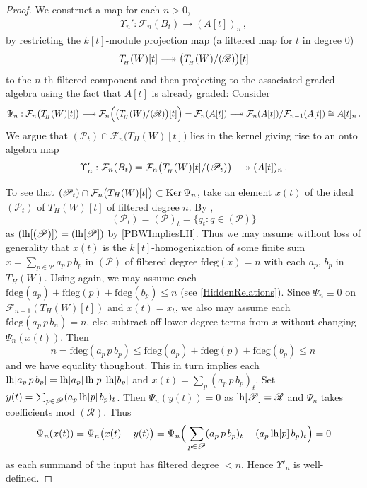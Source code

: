 \documentclass[11pt]{amsart}
\numberwithin{equation}{section}
\newcommand{\BBB}{B}
\newcommand{\sA}{A }
\newcommand{\RR}{\mathscr{R} }
\newcommand{\PP}{\mathscr{P}}
\newcommand{\LH}{{\rm{lh}}}
\renewcommand{\_}[1]{\mbox{$_{\left( #1 \right)}$}}
\newcommand{\F}{\mathcal F}
\renewcommand{\ker}{\mbox{\rm Ker\,}}
\begin{document}
{\begin{proof}
We construct a map for each $n>0$,
$$
\begin{aligned}
  \Upsilon_n': \F_n(\BBB_t)
  \longrightarrow
(\sA[t])_n 
\, ,  
\end{aligned}
$$
by restricting the $k[t]$-module projection map
(a filtered map for $t$ in degree $0$)
$$T_{\! _H}(W)[t]\relbar\joinrel\twoheadrightarrow %
\big(T_{\! _H}(W)/(\RR)\big)[t]
$$
to the $n$-th filtered component
and then projecting to the associated graded algebra
using the fact that $\sA[t]$ is already graded:
Consider
$$
\begin{aligned}
  \Psi_n: 
   \F_n\big(T_{\! _H}(W)[t]\big)
  \relbar\joinrel\twoheadrightarrow %
  \F_n\Big( \big(T_{\! _H}(W)/(\RR)\big)[t]\Big)=\F_n(\sA[t])
  \relbar\joinrel\twoheadrightarrow %
  \F_n(\sA[t])/\F_{n-1}(\sA[t])
  \cong \sA[t]_n
  \,  .
\end{aligned}
$$
We argue that $(\PP_t) \cap \F_n\big(T_{H}(W)[t]\big)$
lies in the kernel
giving rise to an onto
algebra map
$$
\begin{aligned}
\Upsilon'_n: \F_n(\BBB_t) = \F_n\big(T_{\! _H}(W)[t]/(\PP_t)\big)
  \relbar\joinrel\twoheadrightarrow (\sA[t])_n 
\,  .
\end{aligned}
$$

To see that $(\PP_t) \cap \F_n\big(T_{H}(W)[t]\big)
\subset \ker \Psi_n$,
take an element $x(t)$ of the ideal $(\PP_t)$
of $T_{H}(W)[t]$ of filtered degree  $n$.
By \cite[Proposition 1.7]{Li}, 
$$(\PP_t) = (\PP)_t=\{q_t: q \in (\PP)\}$$
as $(\LH[(\PP)]) = (\LH[\PP])$ by \cref{PBWImpliesLH}.
Thus we may assume without loss of generality that
$x(t)$ is the $k[t]$-homogenization of some finite sum
$x=\sum_{p\in \PP} a_p\, p \, b_p$ in $(\PP)$
of filtered degree $\text{fdeg}(x)=n$
with each $a_p$, $b_p$ in $T_H(W)$.
Using \cite[Proposition 1.7]{Li} again,
we may assume each
$
\text{fdeg}(a_p)+
\text{fdeg}(p)+
\text{fdeg}
(b_p)
\leq n$
(see \cref{HiddenRelations}).
Since $\Psi_n\equiv 0$ on $\F_{n-1}(T_H(W)[t])$
and $x(t)=x_t$,
we also may assume
each $\text{fdeg}(a_p \,p \, b_n)=n$,
else subtract off lower degree terms from $x$
without changing $\Psi_n(x(t))$.
Then
$$
n = \text{fdeg}(a_p \, p\, b_p)
\leq 
\text{fdeg}(a_p)+
\text{fdeg}(p)+
\text{fdeg}
(b_p)
\leq
n\, 
$$
and we have equality thoughout.
This in turn implies each $\LH[a_p \, p\, b_p]
= \LH [a_p]\, \LH[p]\, \LH[b_p]$
and $x(t)=\sum_p (a_p\, p\, b_p)_t$.
Set $y(t)=\sum_{p\in \PP} (a_p \, \LH[p]\, b_p)_t$.
Then $\Psi_n(y(t)) = 0$ as $\LH[\PP]=\RR$
and $\Psi_n$ takes coefficients mod $(\RR)$.
Thus
$$
\begin{aligned}
  \Psi_n(x(t))
  =\Psi_n\big(x(t)-y(t) \big)
=\Psi_n\Big(\sum_{p\in\PP}(a_p\, p\, b_p)_t - (a_p\, \LH[p]\, b_p)_t \Big)
=0
\end{aligned}
$$
as each summand of the input has filtered degree $<n$.
Hence $\Upsilon'_n$ is well-defined.


\end{proof}}
\end{document}

